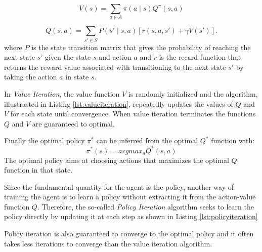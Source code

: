 \begin{equation}
  \label{eq:statevaluefromQ}
  V(s) = \sum_{a\in A} \pi(a \mid s) Q^{\pi} (s,a)
\end{equation}

\begin{equation}
  \label{eq:actionstatevaluefromV}
  Q(s,a) = \sum_{s'\in S} P(s' \mid s,a) [r(s,a,s') + \gamma V (s')].
\end{equation}
where $P$ is the state transition matrix that gives the probability of reaching the next state $s’$ given the state $s$ and action $a$ and $r$ is the reeard function that returns the reward value associated with transitioning to the next state $s'$ by taking the action $a$ in state $s$.

In \textit{Value Iteration}, the value function $V$ is randomly initialized and the algorithm, illustrasted in Listing \ref{lst:valueiteration}, repeatedly updates the values of $Q$ and $V$ for each state until convergence. When value iteration terminates the functions $Q$ and $V$ are guaranteed to optimal.

\begin{center}
  \begin{minipage}{0.65\linewidth}
    
    \end{minipage}
\end{center}
Finally the optimal policy $\pi^{*}$ can be inferred from the optimal $Q^{*}$ function with:
\begin{equation}
  \label{eq:pifromq}
  \pi^{*}(s) = argmax_a Q^{*}(s,a)
\end{equation}
The optimal policy aims at choosing actions that maximizes the optimal $Q$ function in that state.

Since the fundamental quantity for the agent is the policy, another way of training the agent is to learn a policy without extracting it from the action-value function $Q$. Therefore, the so-called \textit{Policy Iteration} algorithm seeks to learn the policy directly by updating it at each step as shown in Listing \ref{lst:policyiteration}
\begin{center}
  \begin{minipage}{0.65\linewidth}
    
    \end{minipage}
\end{center}
Policy iteration is also guaranteed to converge to the optimal policy and it often takes less iterations to converge than the value iteration algorithm.

